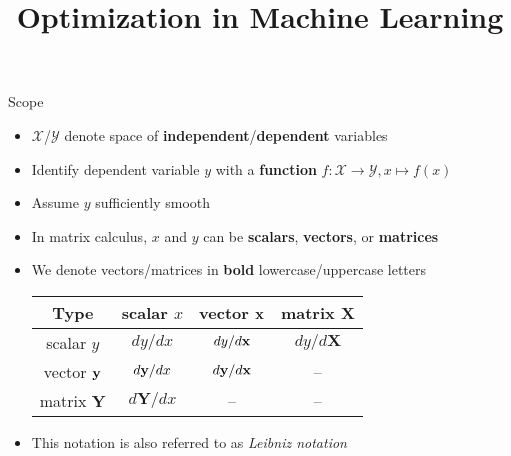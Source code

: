\documentclass[11pt,compress,t,notes=noshow, xcolor=table]{beamer}
\title{Optimization in Machine Learning}
\newcommand{\deriv}{d}
\begin{document}


\begin{vbframe}{Scope}
\begin{itemize}
    \setlength{\itemsep}{0.5\baselineskip}
    \item $\mathcal{X}$/$\mathcal{Y}$ denote space of \textbf{independent}/\textbf{dependent} variables
    \item Identify dependent variable $y$ with a \textbf{function} $f: \mathcal{X} \to \mathcal{Y}, x\mapsto f(x)$
    \item Assume $y$ sufficiently smooth
    \item In matrix calculus, $x$ and $y$ can be \textbf{scalars}, \textbf{vectors}, or \textbf{matrices}
        \item We denote vectors/matrices in \textbf{bold} lowercase/uppercase letters
        \vspace{0.5\baselineskip}
        \begin{table}
            \centering
            \begin{tabular}{c||c|c|c}
                 Type & scalar $x$ & vector $\mathbf{x}$ & matrix $\mathbf{X}$ \\ \hline\hline
                 scalar $y$ & $\deriv y / \deriv x$ & $\deriv y / \deriv\xv$ & $\deriv y / \deriv\mathbf{X}$ \\ \hline
                 vector $\mathbf{y}$ & $\deriv\yv / \deriv x$ & $\deriv\yv / \deriv\xv$ & -- \\ \hline
                 matrix $\mathbf{Y}$ & $\deriv\mathbf{Y} / \deriv x$ & -- & --
            \end{tabular}
        \end{table}
        \item This notation is also referred to as \emph{Leibniz notation}
\end{itemize}
\end{vbframe}
\end{document}

